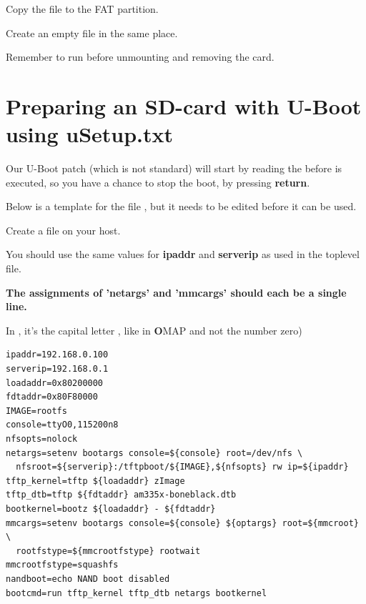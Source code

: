 
Copy the file to the FAT partition.

Create an empty file  in the same place. 

Remember to run  before unmounting and removing the card.

\clearpage
\section{Preparing an SD-card with U-Boot using uSetup.txt}

Our U-Boot patch (which is not standard) will start by reading the 
before  is executed, so you have a chance to stop the boot,
by pressing {\bf return}.

Below is a template for the file , but it needs to be edited
before it can be used. 

Create a  file on your host.

You should use the same values for {\bf ipaddr} and {\bf serverip} as used in the toplevel  file.


{\bf The assignments of 'netargs' and 'mmcargs' should each be a single line.}

In , it's the capital letter , like in {\bf O}MAP and not the number zero)

\begin{verbatim}
ipaddr=192.168.0.100
serverip=192.168.0.1
loadaddr=0x80200000
fdtaddr=0x80F80000
IMAGE=rootfs
console=ttyO0,115200n8
nfsopts=nolock
netargs=setenv bootargs console=${console} root=/dev/nfs \
  nfsroot=${serverip}:/tftpboot/${IMAGE},${nfsopts} rw ip=${ipaddr}
tftp_kernel=tftp ${loadaddr} zImage
tftp_dtb=tftp ${fdtaddr} am335x-boneblack.dtb
bootkernel=bootz ${loadaddr} - ${fdtaddr}
mmcargs=setenv bootargs console=${console} ${optargs} root=${mmcroot} \
  rootfstype=${mmcrootfstype} rootwait
mmcrootfstype=squashfs
nandboot=echo NAND boot disabled
bootcmd=run tftp_kernel tftp_dtb netargs bootkernel
\end{verbatim}

